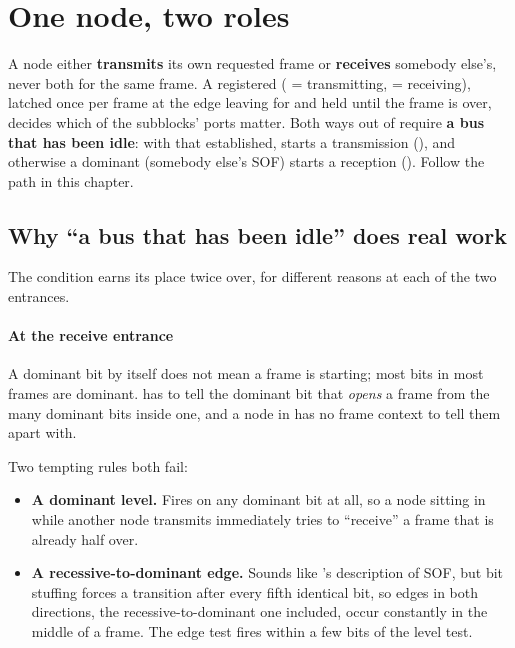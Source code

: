 
\section{One node, two roles}
\label{c16:sec:roles}

A node either \textbf{transmits} its own requested frame or \textbf{receives} somebody else's, never
both for the same frame. A registered  ( = transmitting,  =
receiving), latched once per frame at the edge leaving  for  and
held until the frame is over, decides which of the subblocks' ports matter. Both ways out of
 require \textbf{a bus that has been idle}: with that established,  starts a transmission (), and otherwise a dominant  (somebody
else's SOF) starts a reception (). Follow the  path in this
chapter.

\subsection*{Why ``a bus that has been idle'' does real work}
The condition earns its place twice over, for different reasons at each of the two entrances.

\paragraph{At the receive entrance}
A dominant bit by itself does not mean a frame is starting; most bits in most frames are dominant.
 has to tell the dominant bit that \emph{opens} a frame from the many dominant bits
inside one, and a node in  has no frame context to tell them apart with.

Two tempting rules both fail:
\begin{itemize}
  \item \textbf{A dominant level.} Fires on any dominant bit at all, so a node sitting in
     while another node transmits immediately tries to ``receive'' a frame that is
    already half over.
  \item \textbf{A recessive-to-dominant edge.} Sounds like 's description
    of SOF, but bit stuffing forces a transition after every fifth identical bit, so edges in both
    directions, the recessive-to-dominant one included, occur constantly in the middle of a frame.
    The edge test fires within a few bits of the level test.
\end{itemize}

